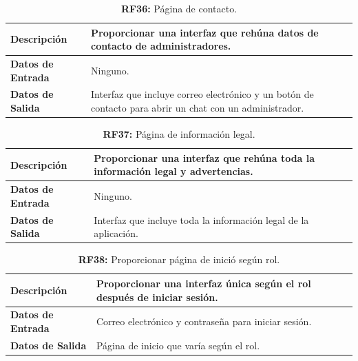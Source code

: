 \documentclass[a4paper, 12pt]{article}
\begin{document}
\begin{table}[H]
\captionsetup{justification=raggedright,singlelinecheck=false}
\caption{\textbf{RF36:} Página de contacto.}
\label{tab:RF36}
	\begin{tabular}{|m{5cm}|m{10cm}|}
	\hline
	\textbf{Descripción} & Proporcionar una interfaz que rehúna datos de contacto de administradores. \\ 
	\hline
	\textbf{Datos de Entrada} & Ninguno. \\ 
	\hline
	\textbf{Datos de Salida} & Interfaz que incluye correo electrónico y un botón de contacto para abrir un chat con un administrador. \\ 
	\hline
\end{tabular}
\end{table}

\begin{table}[H]
\captionsetup{justification=raggedright,singlelinecheck=false}
\caption{\textbf{RF37:} Página de información legal.}
\label{tab:RF37}
	\begin{tabular}{|m{5cm}|m{10cm}|}
	\hline
	\textbf{Descripción} & Proporcionar una interfaz que rehúna toda la información legal y advertencias. \\ 
	\hline
	\textbf{Datos de Entrada} & Ninguno. \\ 
	\hline
	\textbf{Datos de Salida} & Interfaz que incluye toda la información legal de la aplicación. \\ 
	\hline
\end{tabular}
\end{table}

\begin{table}[H]
\captionsetup{justification=raggedright,singlelinecheck=false}
\caption{\textbf{RF38:} Proporcionar página de inició según rol.}
\label{tab:RF38}
	\begin{tabular}{|m{5cm}|m{10cm}|}
	\hline
	\textbf{Descripción} & Proporcionar una interfaz única según el rol después de iniciar sesión. \\ 
	\hline
	\textbf{Datos de Entrada} & Correo electrónico y contraseña para iniciar sesión. \\ 
	\hline
	\textbf{Datos de Salida} & Página de inicio que varía según el rol. \\ 
	\hline
\end{tabular}
\end{table}
\end{document}
